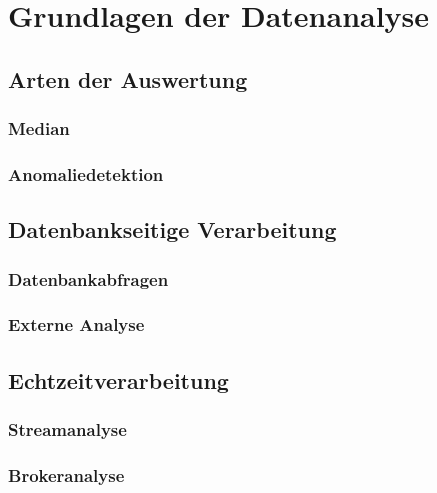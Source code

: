 \section{Grundlagen der Datenanalyse}

\subsection{Arten der Auswertung}
\subsubsection{Median}
\subsubsection{Anomaliedetektion}

\subsection{Datenbankseitige Verarbeitung}
\subsubsection{Datenbankabfragen}
\subsubsection{Externe Analyse}

\subsection{Echtzeitverarbeitung}
\subsubsection{Streamanalyse}
\subsubsection{Brokeranalyse}